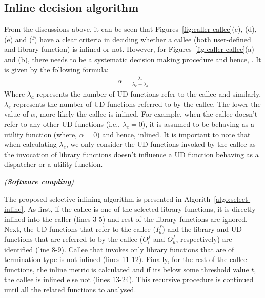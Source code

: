 \subsection{Inline decision algorithm}

From the discussions above, it can be seen that Figures~\ref{fig:caller-callee}(c), (d), (e) and (f) have a clear criteria in deciding whether a callee (both user-defined and library function) is inlined or not. However, for Figures~\ref{fig:caller-callee}(a) and (b), there needs to be a systematic decision making procedure and hence, . It is given by the following formula:
\begin{equation}
\begin{aligned}
 \alpha = \frac{\lambda_e}{\lambda_e + \lambda_a}
\end{aligned}
\end{equation}
Where $\lambda_a$ represents the number of UD functions refer to the callee and similarly,  $\lambda_e$ represents the number of UD functions referred to by the callee. The lower the value of $\alpha$, more likely the callee is inlined. For example, when the callee doesn't refer to any other UD functions (i.e., $\lambda_e = 0$), it is assumed to be behaving as a utility function (where, $\alpha = 0$) and hence, inlined. It is important to note that when calculating $\lambda_e$, we only consider the UD functions invoked by the callee as the invocation of library functions doesn't influence a UD function behaving as a dispatcher or a utility function. 

\begin{mydef} \label{def:comp_semantic}
\emph{(\textbf{Software coupling})}
\end{mydef}

The proposed selective inlining algorithm is presented in Algorith~\ref{algo:select-inline}. As first, if the callee is one of the selected library functions, it is directly inlined into the caller (lines 3-5) and rest of the library functions are ignored. Next, the UD functions that refer to the callee ($I_u^f$) and the library and UD functions that are referred to by the callee ($O_l^f$ and $O_u^f$, respectively) are identified (line 8-9). Callee that invokes only library functions that are of termination type is not inlined (lines 11-12). Finally, for the rest of the callee functions, the inline metric is calculated and if its below some threshold value $t$, the callee is inlined else not (lines 13-24). This recursive procedure is continued until all the related functions to analysed.    

